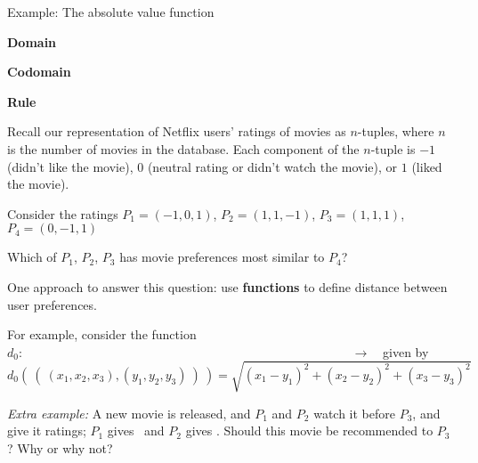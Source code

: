 \documentclass[12pt, oneside]{article}
\newcommand{\cmark}{\ding{51}}
\newcommand{\xmark}{\ding{55}}
\begin{document}

\vfill

Example: The absolute value function 

{\bf Domain}

{\bf Codomain}

{\bf Rule}

\vfill 
 

Recall our representation of Netflix users' ratings of movies as $n$-tuples, where
$n$ is the number of movies in the database. 
Each component of the $n$-tuple is $-1$ (didn't like the movie), $0$ 
(neutral rating or didn't watch the movie), or $1$ (liked the movie).

Consider the ratings $P_1 = (-1, 0, 1)$, $P_2 = (1, 1, -1)$, $P_3 = (1, 1, 1)$,
$P_4 = (0,-1,1)$


Which of $P_1$, $P_2$, $P_3$ has movie preferences most similar to $P_4$?

One approach to answer this question: use {\bf functions} to define distance between user preferences.

For example, consider the function 
$d_0: \phantom{the Cartesian product of the set of ratings on 3 movies with itself} \to \phantom{\mathbb{R}}$
given by
\[
d_0 (~(~ (x_1, x_2, x_3), (y_1, y_2, y_3) ~) ~) = \sqrt{ (x_1 - y_1)^2 + (x_2 - y_2)^2 + (x_3 -y_3)^2}
\]


\vfill
\vfill


{\it Extra example:} A new movie is released, and $P_1$ and $P_2$ watch it before $P_3$, and give it
ratings; $P_1$ gives \cmark~and $P_2$ gives \xmark.
Should this movie be recommended to $P_3$? Why or why not?
\end{document}

